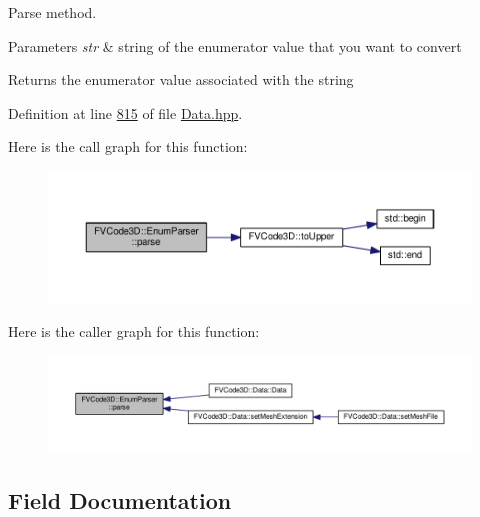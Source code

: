 Parse method. 


\begin{DoxyParams}{Parameters}
{\em str} & string of the enumerator value that you want to convert \\
\hline
\end{DoxyParams}
\begin{DoxyReturn}{Returns}
the enumerator value associated with the string 
\end{DoxyReturn}


Definition at line \hyperlink{Data_8hpp_source_l00815}{815} of file \hyperlink{Data_8hpp_source}{Data.\+hpp}.



Here is the call graph for this function\+:
\nopagebreak
\begin{figure}[H]
\begin{center}
\leavevmode
\includegraphics[width=350pt]{classFVCode3D_1_1EnumParser_a47ae536aad82ef52509472c0c7f1022e_cgraph}
\end{center}
\end{figure}




Here is the caller graph for this function\+:
\nopagebreak
\begin{figure}[H]
\begin{center}
\leavevmode
\includegraphics[width=350pt]{classFVCode3D_1_1EnumParser_a47ae536aad82ef52509472c0c7f1022e_icgraph}
\end{center}
\end{figure}




\subsection{Field Documentation}

